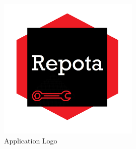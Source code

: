 \begin{figure}[H]
    \caption{Application Logo}
    \label{image:RepotaLogo}
    \centering
    \includegraphics[width=0.6\textwidth]{images/repota/repotaApp_logo.png}
\end{figure}

\newpage

